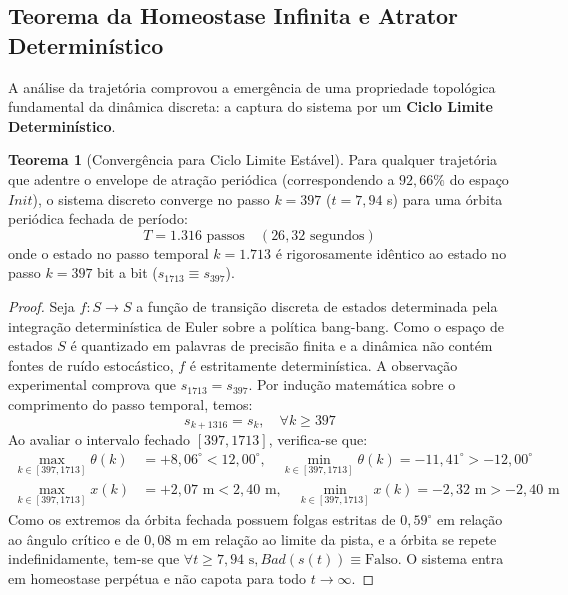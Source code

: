 \documentclass[11pt,a4paper]{article}
\theoremstyle{definition}
\newtheorem{theorem}{Teorema}
\begin{document}
\subsection{Teorema da Homeostase Infinita e Atrator Determinístico}

A análise da trajetória comprovou a emergência de uma propriedade topológica fundamental da dinâmica discreta: a captura do sistema por um \textbf{Ciclo Limite Determinístico}.

\begin{theorem}[Convergência para Ciclo Limite Estável]
Para qualquer trajetória que adentre o envelope de atração periódica (correspondendo a $92{,}66\%$ do espaço $Init$), o sistema discreto converge no passo $k = 397$ ($t = 7{,}94$ s) para uma órbita periódica fechada de período:
\begin{equation}
    T = 1.316 \text{ passos} \quad (26{,}32 \text{ segundos})
\end{equation}
onde o estado no passo temporal $k = 1.713$ é rigorosamente idêntico ao estado no passo $k = 397$ bit a bit ($s_{1713} \equiv s_{397}$).
\end{theorem}

\begin{proof}
Seja $f: S \to S$ a função de transição discreta de estados determinada pela integração determinística de Euler sobre a política bang-bang. Como o espaço de estados $S$ é quantizado em palavras de precisão finita e a dinâmica não contém fontes de ruído estocástico, $f$ é estritamente determinística. A observação experimental comprova que $s_{1713} = s_{397}$. Por indução matemática sobre o comprimento do passo temporal, temos:
\begin{equation}
    s_{k + 1316} = s_k, \quad \forall k \ge 397
\end{equation}
Ao avaliar o intervalo fechado $[397, 1713]$, verifica-se que:
\begin{align}
    \max_{k \in [397, 1713]} \theta(k) &= +8{,}06^\circ < 12{,}00^\circ, \quad \min_{k \in [397, 1713]} \theta(k) = -11{,}41^\circ > -12{,}00^\circ \\
    \max_{k \in [397, 1713]} x(k) &= +2{,}07\text{ m} < 2{,}40\text{ m}, \quad \min_{k \in [397, 1713]} x(k) = -2{,}32\text{ m} > -2{,}40\text{ m}
\end{align}
Como os extremos da órbita fechada possuem folgas estritas de $0{,}59^\circ$ em relação ao ângulo crítico e de $0{,}08$ m em relação ao limite da pista, e a órbita se repete indefinidamente, tem-se que $\forall t \ge 7{,}94\text{ s}, Bad(s(t)) \equiv \text{Falso}$. O sistema entra em homeostase perpétua e não capota para todo $t \to \infty$.
\end{proof}
\end{document}
